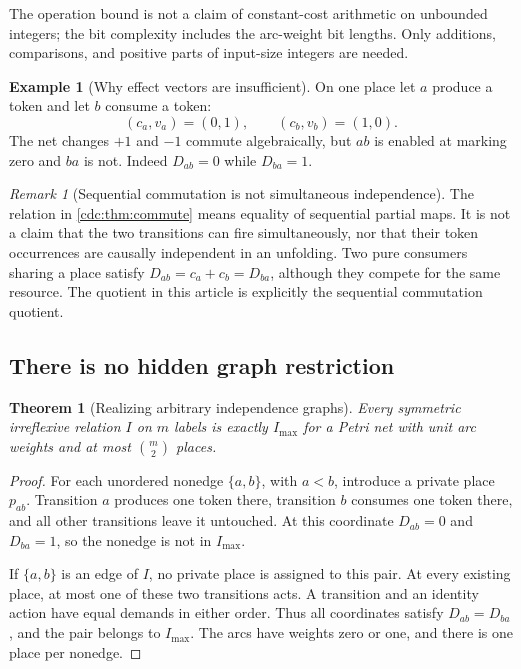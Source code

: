 \documentclass[11pt,a4paper]{article}
\newtheorem{theorem}{Theorem}[section]
\theoremstyle{definition}
\newtheorem{example}[example]{Example}
\theoremstyle{remark}
\newtheorem{remark}[remark]{Remark}
\begin{document}
The operation bound is not a claim of constant-cost arithmetic on unbounded integers; the bit complexity includes the arc-weight bit lengths. Only additions, comparisons, and positive parts of input-size integers are needed.

\begin{example}[Why effect vectors are insufficient]
On one place let $a$ produce a token and let $b$ consume a token:
\[
(c_a,v_a)=(0,1),\qquad(c_b,v_b)=(1,0).
\]
The net changes $+1$ and $-1$ commute algebraically, but $ab$ is enabled at marking zero and $ba$ is not. Indeed $D_{ab}=0$ while $D_{ba}=1$.
\end{example}

\begin{remark}[Sequential commutation is not simultaneous independence]
The relation in \cref{cdc:thm:commute} means equality of sequential partial maps. It is not a claim that the two transitions can fire simultaneously, nor that their token occurrences are causally independent in an unfolding. Two pure consumers sharing a place satisfy $D_{ab}=c_a+c_b=D_{ba}$, although they compete for the same resource. The quotient in this article is explicitly the sequential commutation quotient.
\end{remark}

\subsection{There is no hidden graph restriction}
\begin{theorem}[Realizing arbitrary independence graphs]\label{cdc:thm:graph}
Every symmetric irreflexive relation $I$ on $m$ labels is exactly $I_{\max}$ for a Petri net with unit arc weights and at most $\binom m2$ places.
\end{theorem}
\begin{proof}
For each unordered nonedge $\{a,b\}$, with $a<b$, introduce a private place $p_{ab}$. Transition $a$ produces one token there, transition $b$ consumes one token there, and all other transitions leave it untouched. At this coordinate $D_{ab}=0$ and $D_{ba}=1$, so the nonedge is not in $I_{\max}$.

If $\{a,b\}$ is an edge of $I$, no private place is assigned to this pair. At every existing place, at most one of these two transitions acts. A transition and an identity action have equal demands in either order. Thus all coordinates satisfy $D_{ab}=D_{ba}$, and the pair belongs to $I_{\max}$. The arcs have weights zero or one, and there is one place per nonedge.
\end{proof}
\end{document}
